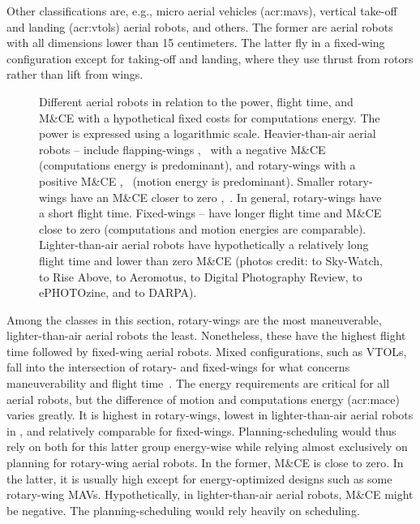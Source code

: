 Other classifications are, e.g., micro aerial vehicles (\Gls{acr:mav}s), vertical take-off and landing (\Gls{acr:vtol}s) aerial robots, and others. The former are aerial robots with all dimensions lower than 15 centimeters. The latter fly in a fixed-wing configuration except for taking-off and landing, where they use thrust from rotors rather than lift from wings.

\begin{figure}[p!]
  \centering
  \footnotesize{}\selectfont
  
  \vspace*{36pt}
  \caption[Different aerial robots in relation to the power, flight time, and M\&CE]{Different aerial robots in relation to the power, flight time, and M\&CE with a hypothetical fixed costs for computations energy. The power is expressed using a logarithmic scale. Heavier-than-air aerial robots -- include flapping-wings ,~ with a negative M\&CE (computations energy is predominant), and rotary-wings with a positive M\&CE ,~ (motion energy is predominant). Smaller rotary-wings have an M\&CE closer to zero ,~. In general, rotary-wings have a short flight time. Fixed-wings -- have longer flight time and M\&CE close to zero (computations and motion energies are comparable). Lighter-than-air aerial robots  have hypothetically a relatively long flight time and lower than zero M\&CE {\scriptsize(photos credit:  to Sky-Watch,  to Rise Above,  to Aeromotus,  to Digital Photography Review,  to ePHOTOzine, and  to DARPA)}.}
  \label{fig:robots-vs-power}
\end{figure}

Among the classes in this section, rotary-wings are the most maneuverable, lighter-than-air aerial robots the least. Nonetheless, these have the highest flight time followed by fixed-wing aerial robots. Mixed configurations, such as VTOLs, fall into the intersection of rotary- and fixed-wings for what concerns maneuverability and flight time~\citep{siciliano2016springer}. The energy requirements are critical for all aerial robots, but the difference of motion and computations energy (\Gls{acr:mace}) varies greatly. It is highest in rotary-wings, lowest in lighter-than-air aerial robots in , and relatively comparable for fixed-wings. Planning-scheduling would thus rely on both for this latter group energy-wise while relying almost exclusively on planning for rotary-wing aerial robots. In the former, M\&CE is close to zero. In the latter, it is usually high except for energy-optimized designs such as some rotary-wing MAVs. Hypothetically, in lighter-than-air aerial robots, M\&CE might be negative. The planning-scheduling would rely heavily on scheduling.

